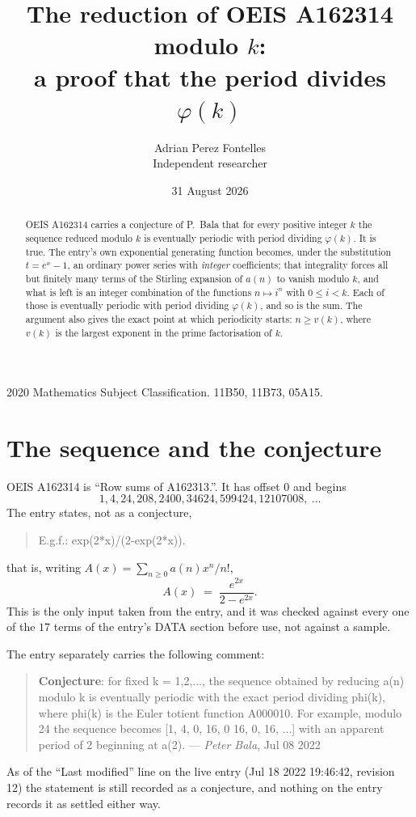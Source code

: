 \documentclass[11pt,a4paper]{article}
\title{The reduction of OEIS A162314 modulo $k$:\\ a proof that the period divides
$\varphi(k)$}
\author{Adrian Perez Fontelles\\ \small Independent researcher}
\date{31 August 2026}
\theoremstyle{plain}
\theoremstyle{definition}
\begin{document}
\maketitle

\begin{abstract}
OEIS A162314 carries a conjecture of P.~Bala that for every positive integer $k$ the
sequence reduced modulo $k$ is eventually periodic with period dividing $\varphi(k)$.
It is true. The entry's own exponential generating function becomes, under the
substitution $t=e^{x}-1$, an ordinary power series with \emph{integer} coefficients;
that integrality forces all but finitely many terms of the Stirling expansion of $a(n)$
to vanish modulo $k$, and what is left is an integer combination of the functions
$n\mapsto i^{n}$ with $0\le i<k$. Each of those is eventually periodic with period
dividing $\varphi(k)$, and so is the sum. The argument also gives the exact point at
which periodicity starts: $n\ge v(k)$, where $v(k)$ is the largest exponent in the
prime factorisation of $k$.
\end{abstract}

\noindent\small 2020 Mathematics Subject Classification. 11B50, 11B73, 05A15.\normalsize

\section{The sequence and the conjecture}

OEIS A162314 is ``Row sums of A162313.''. It has offset $0$ and begins
\[
1, 4, 24, 208, 2400, 34624, 599424, 12107008,\ \dots
\]
The entry states, not as a conjecture,
\begin{quote}\small
E.g.f.: exp(2*x)/(2-exp(2*x)).
\end{quote}
that is, writing $A(x)=\sum_{n\ge 0}a(n)x^{n}/n!$,
\begin{equation}\label{eq:egf}
A(x)\;=\;\frac{e^{2x}}{2-e^{2x}}.
\end{equation}
This is the only input taken from the entry, and it was checked against every one of the
$17$ terms of the entry's DATA section before use, not against a sample.

The entry separately carries the following comment:
\begin{quote}\small
\textbf{Conjecture}: for fixed k = 1,2,..., the sequence obtained by reducing a(n) modulo k is eventually periodic with the exact period dividing phi(k), where phi(k) is the Euler totient function A000010. For example, modulo 24 the sequence becomes [1, 4, 0, 16, 0 16, 0, 16, ...] with an apparent period of 2 beginning at a(2). --- \emph{Peter Bala}, Jul 08 2022
\end{quote}
As of the ``Last modified'' line on the live entry (Jul 18 2022 19:46:42, revision
12) the statement is still recorded as a conjecture, and nothing on the entry
records it as settled either way.
\end{document}
